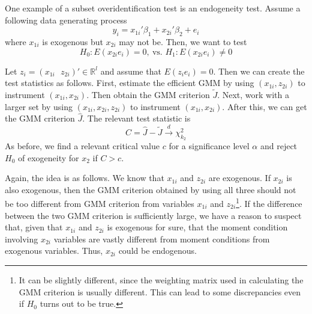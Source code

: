 \documentclass[12pt]{article}
\theoremstyle{definition}
\theoremstyle{property}
\theoremstyle{assumption}
\theoremstyle{example}
\theoremstyle{comment}
\begin{document}
\par
One example of a subset overidentification test is an endogeneity test. Assume a following data generating process
\[
y_i=x_{1i}'\beta_1+x_{2i}'\beta_2+e_i
\]
where $x_{1i}$ is exogenous but $x_{2i}$ may not be. Then, we want to test
\[
H_0: E(x_{2i}e_i)=0, \ \text{vs. }H_1:E(x_{2i}e_i)\neq0
\]\par
Let $z_i = (x_{1i} \ \ \ z_{2i})'\in\mathbb{R}^{l}$ and assume that $E(z_ie_i)=0$. Then we can create the test statistics as follows. First, estimate the efficient GMM by using $(x_{1i}, z_{2i})$ to instrument $(x_{1i}, x_{2i})$. Then obtain the GMM criterion $\tilde{J}$. Next, work with a larger set by using $(x_{1i}, x_{2i}, z_{2i})$ to instrument $(x_{1i}, x_{2i})$. After this, we can get the GMM criterion $\widehat{J}$. The relevant test statistic is
\[
C = \widehat{J}-\tilde{J} \xrightarrow{d} \chi^2_{k_2}
\]
As before, we find a relevant critical value $c$ for a significance level $\alpha$ and reject $H_0$ of exogeneity for $x_2$ if $C>c$. \par

Again, the idea is as follows. We know that $x_{1i}$ and $z_{2i}$ are exogenous. If $x_{2i}$ is also exogenous, then the GMM criterion obtained by using all three should not be too different from GMM criterion from variables $x_{1i}$ and $z_{2i}$\footnote{It can be slightly different, since the weighting matrix used in calculating the GMM criterion is usually different. This can lead to some discrepancies even if $H_0$ turns out to be true. }. If the difference between the two GMM criterion is sufficiently large, we have a reason to suspect that, given that $x_{1i}$ and $z_{2i}$ is exogenous for sure, that the moment condition involving $x_{2i}$ variables are vastly different from moment conditions from exogenous variables. Thus, $x_{2i}$ could be endogenous.  \par
\end{document}
